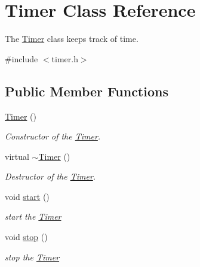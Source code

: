 \hypertarget{class_timer}{}\section{Timer Class Reference}
\label{class_timer}


The \hyperlink{class_timer}{Timer} class keeps track of time.  




{\ttfamily \#include $<$timer.\+h$>$}

\subsection*{Public Member Functions}
\begin{DoxyCompactItemize}
\item 
\hyperlink{class_timer_a5f16e8da27d2a5a5242dead46de05d97}{Timer} ()
\begin{DoxyCompactList}\small\item\em Constructor of the \hyperlink{class_timer}{Timer}. \end{DoxyCompactList}\item 
\mbox{\label{class_timer_a14fa469c4c295c5fa6e66a4ad1092146}} 
virtual \hyperlink{class_timer_a14fa469c4c295c5fa6e66a4ad1092146}{$\sim$\+Timer} ()
\begin{DoxyCompactList}\small\item\em Destructor of the \hyperlink{class_timer}{Timer}. \end{DoxyCompactList}\item 
\mbox{\label{class_timer_a3a8b5272198d029779dc9302a54305a8}} 
void \hyperlink{class_timer_a3a8b5272198d029779dc9302a54305a8}{start} ()
\begin{DoxyCompactList}\small\item\em start the \hyperlink{class_timer}{Timer} \end{DoxyCompactList}\item 
\mbox{\label{class_timer_a63f0eb44b27402196590a03781515dba}} 
void \hyperlink{class_timer_a63f0eb44b27402196590a03781515dba}{stop} ()
\begin{DoxyCompactList}\small\item\em stop the \hyperlink{class_timer}{Timer} \end{DoxyCompactList}\item 
\mbox{\label{class_timer_a0289effad7b573c508bc27e405900a23}} 

\end{DoxyCompactItemize}
